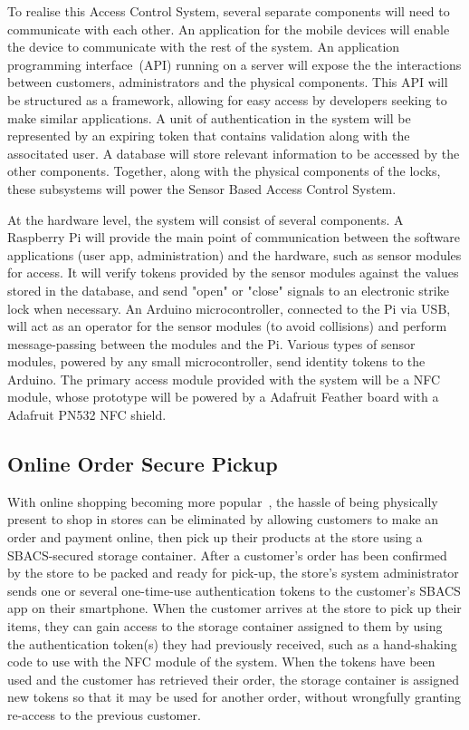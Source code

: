 \documentclass{article}
\begin{document}


To realise this Access Control System, several separate components will need to communicate with each other. An
application for the mobile devices will enable the device to communicate with the rest of the system. An application
programming interface~(API) running on a server will expose the the interactions between customers, administrators and
the physical components. This API will be structured as a framework, allowing for easy access by developers seeking to
make similar applications. A unit of authentication in the system will be represented by an expiring token that contains
validation along with the associtated user. A database will store relevant information to be accessed by the other
components. Together, along with the physical components of the locks, these subsystems will power the Sensor Based
Access Control System.

At the hardware level, the system will consist of several components. A Raspberry Pi will provide the main point of 
communication between the software applications (user app, administration) and the hardware, such as sensor modules for 
access. It will verify tokens provided by the sensor modules against the values stored in the database, and send "open" 
or "close" signals to an electronic strike lock when necessary. An Arduino microcontroller, connected to the Pi via 
USB, will act as an operator for the sensor modules (to avoid collisions) and perform message-passing between the 
modules and the Pi. Various types of sensor modules, powered by any small microcontroller, send identity tokens to the 
Arduino. The primary access module provided with the system will be a NFC module, whose prototype will be powered by a 
Adafruit Feather board with a Adafruit PN532 NFC shield.

\subsection{Online Order Secure Pickup}

With online shopping becoming more popular~\autocite{CUSTORA}, the hassle of being physically present to shop in stores 
can be eliminated by allowing customers to make an order and payment online, then pick up their products at the store 
using a SBACS-secured storage container. After a customer's order has been confirmed by the store to be packed 
and ready for pick-up, the store's system administrator sends one or several one-time-use authentication tokens 
to the customer's SBACS app on their smartphone. When the customer arrives at the store to pick up their items, 
they can gain access to the storage container assigned to them by using the authentication token(s) they had previously 
received, such as a hand-shaking code to use with the NFC module of the system. When the tokens have been used and the 
customer has retrieved their order, the storage container is assigned new tokens so that it may be used for another 
order, without wrongfully granting re-access to the previous customer.
\end{document}
